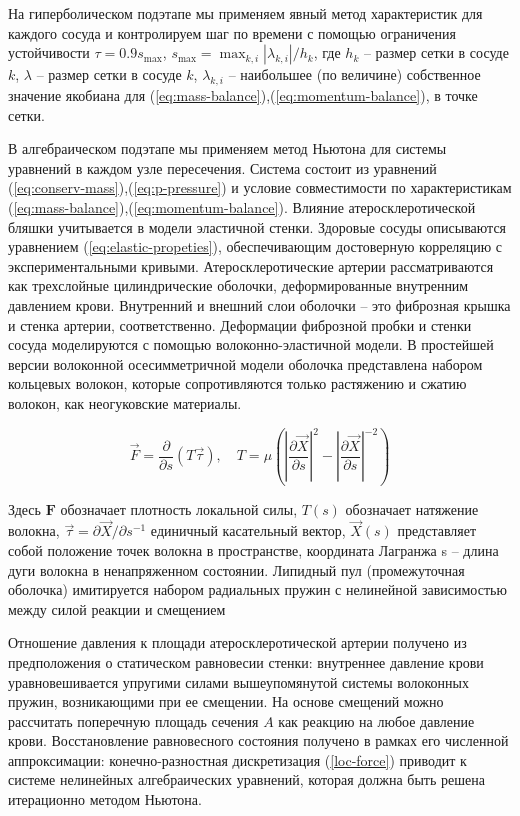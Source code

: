 На гиперболическом подэтапе мы применяем явный метод характеристик для каждого сосуда и контролируем шаг по времени с помощью ограничения устойчивости $\tau = 0.9 s_{\max}$, $s_{\max}=\max_{k,i}|\lambda _{k,i}|/h_k$, где $h_k$ -- размер сетки в сосуде $k$, $\lambda$ -- размер сетки в сосуде $k$,  $\lambda _{k,i}$ -- наибольшее (по величине) собственное значение якобиана для  (\ref{eq:mass-balance}),(\ref{eq:momentum-balance}),  в точке сетки.

В алгебраическом подэтапе мы применяем метод Ньютона для системы уравнений в каждом узле пересечения. Система состоит из уравнений (\ref{eq:conserv-mass}),(\ref{eq:p-pressure}) и условие совместимости по характеристикам (\ref{eq:mass-balance}),(\ref{eq:momentum-balance}). Влияние атеросклеротической бляшки учитывается в модели эластичной стенки. Здоровые сосуды описываются уравнением (\ref{eq:elastic-propeties}), обеспечивающим достоверную корреляцию с экспериментальными кривыми. Атеросклеротические артерии рассматриваются как трехслойные цилиндрические оболочки, деформированные внутренним давлением крови. Внутренний и внешний слои оболочки -- это фиброзная крышка и стенка артерии, соответственно. Деформации фиброзной пробки и стенки сосуда моделируются с помощью волоконно-эластичной модели. В простейшей версии волоконной осесимметричной модели оболочка представлена набором кольцевых волокон, которые сопротивляются только растяжению и сжатию волокон, как неогуковские материалы.

\begin{equation}
    \label{loc-force}
    \Vec{F}=\frac{\partial}{\partial s}(T\Vec{\tau}),
    \quad
    T=\mu\left(\left|\frac{\partial \Vec{X}}{\partial s}\right|^2-\left|\frac{\partial \Vec{X}}{\partial s}\right|^{-2}\right)
\end{equation}


Здесь $\mathbf{F}$ обозначает плотность локальной силы, $T(s)$ обозначает натяжение волокна, $\Vec{\tau} =\partial \Vec{X}/\partial s^{-1}$ единичный касательный вектор, $\Vec{X}(s)$ представляет собой положение точек волокна в пространстве, координата Лагранжа s -- длина дуги волокна в ненапряженном состоянии. Липидный пул (промежуточная оболочка) имитируется набором радиальных пружин с нелинейной зависимостью между силой реакции и смещением

Отношение давления к площади атеросклеротической артерии получено из предположения о статическом равновесии стенки: внутреннее давление крови уравновешивается упругими силами вышеупомянутой системы волоконных пружин, возникающими при ее смещении. На основе смещений можно рассчитать поперечную площадь сечения $A$ как реакцию на любое давление крови. 
Восстановление равновесного состояния получено в рамках его численной аппроксимации: конечно-разностная дискретизация (\ref{loc-force}) приводит к системе нелинейных алгебраических уравнений, которая должна быть решена итерационно методом Ньютона.


